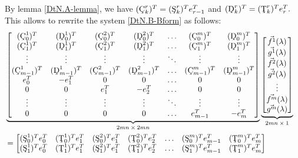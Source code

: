 \documentclass[10pt,reqno,oneside,a4paper]{article}
\begin{document}
By lemma \ref{DtN.A-lemma}, we have $(\textup{\c{C}}^r_k)^T =(\textup{\c{S}}^r_k)^T e_{r-1}^T$ and $(\textup{\c{D}}^r_k)^T = (\textup{\c{T}}^r_k)^T e_{r}^T.$ This allows to rewrite the system \eqref{DtN.B-Bform} as follows:
\begin{align}
&\underbrace{
\begin{bmatrix}
(\textup{\c{C}}^1_0)^T & (\textup{\c{D}}^1_0)^T & (\textup{\c{C}}^2_0)^T & (\textup{\c{D}}^2_0)^T & \ldots &  (\textup{\c{C}}^m_0)^T & (\textup{\c{D}}^m_0)^T \\
(\textup{\c{C}}^1_1)^T &  (\textup{\c{D}}^1_1)^T & (\textup{\c{C}}^2_1)^T & (\textup{\c{D}}^2_1)^T & \ldots  &(\textup{\c{C}}^m_1)^T& (\textup{\c{D}}^m_1)^T \\
\vdots & \vdots & \vdots & \vdots & \ddots & \vdots & \vdots \\
(\textup{\c{C}}^1_{m-1})^T & (\textup{\c{D}}^1_{m-1})^T & (\textup{\c{C}}^2_{m-1})^T & (\textup{\c{D}}^2_{m-1})^T & \ldots & (\textup{\c{C}}^m_{m-1})^T & (\textup{\c{D}}^m_{m-1})^T \\
e_{0}^T & -e_1^T & 0 & 0 & \ldots & 0 & 0  \\
0 & 0 & e_{1}^T & -e_2^T & \ldots & 0 & 0  \\
\vdots & \vdots & \vdots &  \vdots & \ddots & \vdots & \vdots \\
0 & 0 & 0 & 0 & \ldots & e_{m-1}^T & -e_{m}^T 
\end{bmatrix}}_\text{$2mn \times 2mn$}
\underbrace{
\begin{bmatrix}
\vec{f^1}(\lambda) \\ \vec{g^1}(\lambda) \\
\vec{f^2}(\lambda) \\ \vec{g^2}(\lambda) \\
\vdots \\
\vec{f^m}(\lambda) \\ \vec{g^m}(\lambda) 
\end{bmatrix}}_\text{$2mn \times 1$} & \nonumber\\
&= \begin{bmatrix}
(\textup{\c{S}}^1_0)^T e_{0}^T & (\textup{\c{T}}^1_0)^Te_{1}^T & (\textup{\c{S}}^2_0)^T e_{1}^T& (\textup{\c{T}}^2_0)^T e_{2}^T & \ldots & (\textup{\c{S}}^m_0)^T e_{m-1}^T& (\textup{\c{T}}^m_0)^Te_{m}^T \\
(\textup{\c{S}}^1_1)^T e_{0}^T &  (\textup{\c{T}}^1_1)^Te_{1}^T & (\textup{\c{S}}^2_1)^T e_{1}^T& (\textup{\c{T}}^2_1)^T e_{2}^T& \ldots  & (\textup{\c{S}}^m_1)^T e_{m-1}^T& (\textup{\c{T}}^m_1)^Te_{m}^T \\

\end{bmatrix}
\end{align}
\end{document}
